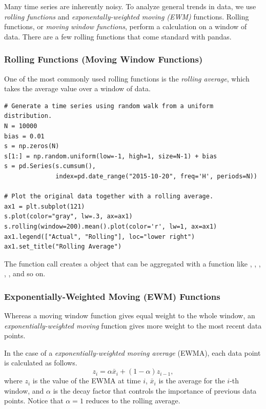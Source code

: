 Many time series are inherently noisy.
To analyze general trends in data, we use \emph{rolling functions} and \emph{exponentally-weighted moving (EWM)} functions.
Rolling functions, or \emph{moving window functions}, perform a calculation on a window of data.
There are a few rolling functions that come standard with pandas.

\subsubsection*{Rolling Functions (Moving Window Functions)}

One of the most commonly used rolling functions is the \emph{rolling average}, which takes the average value over a window of data.

\begin{lstlisting}
# Generate a time series using random walk from a uniform distribution.
N = 10000
bias = 0.01
s = np.zeros(N)
s[1:] = np.random.uniform(low=-1, high=1, size=N-1) + bias
s = pd.Series(s.cumsum(),
              index=pd.date_range("2015-10-20", freq='H', periods=N))

# Plot the original data together with a rolling average.
ax1 = plt.subplot(121)
s.plot(color="gray", lw=.3, ax=ax1)
s.rolling(window=200).mean().plot(color='r', lw=1, ax=ax1)
ax1.legend(["Actual", "Rolling"], loc="lower right")
ax1.set_title("Rolling Average")
\end{lstlisting}

The function call  creates a  object that can be aggregated with a function like , , , , , and so on.

\subsubsection*{Exponentially-Weighted Moving (EWM) Functions}

Whereas a moving window function gives equal weight to the whole window, an \emph{exponentially-weighted moving} function gives more weight to the most recent data points.

In the case of a \emph{exponentially-weighted moving average} (EWMA), each data point is calculated as follows.
\[
z_i = \alpha \bar{x}_i + (1 - \alpha)z_{i-1},
\]
where $z_i$ is the value of the EWMA at time $i$, $\bar{x}_i$ is the average for the $i$-th window, and $\alpha$ is the decay factor that controls the importance of previous data points.
Notice that $\alpha=1$ reduces to the rolling average.

